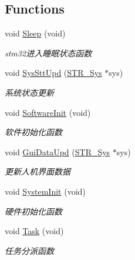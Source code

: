 \subsection*{\-Functions}
\begin{DoxyCompactItemize}
\item 
void \hyperlink{group___m_a_n_a_g_e_ga6ae21a567d8b7f88c319620bd458f1e2}{\-Sleep} (void)
\begin{DoxyCompactList}\small\item\em stm32进入睡眠状态函数 \end{DoxyCompactList}\item 
void \hyperlink{group___m_a_n_a_g_e_ga8dcf623cce7777facf0cc0223fab8e19}{\-Sys\-Stt\-Upd} (\hyperlink{struct_s_t_r___sys}{\-S\-T\-R\-\_\-\-Sys} $\ast$sys)
\begin{DoxyCompactList}\small\item\em 系统状态更新 \end{DoxyCompactList}\item 
\hypertarget{group___m_a_n_a_g_e_ga601c095b03e6638b39ed349f4c24b69e}{void \hyperlink{group___m_a_n_a_g_e_ga601c095b03e6638b39ed349f4c24b69e}{\-Software\-Init} (void)}\label{group___m_a_n_a_g_e_ga601c095b03e6638b39ed349f4c24b69e}

\begin{DoxyCompactList}\small\item\em 软件初始化函数 \end{DoxyCompactList}\item 
\hypertarget{group___m_a_n_a_g_e_gae5433f92dfcd0d1adfc3c045eab15253}{void \hyperlink{group___m_a_n_a_g_e_gae5433f92dfcd0d1adfc3c045eab15253}{\-Gui\-Data\-Upd} (\hyperlink{struct_s_t_r___sys}{\-S\-T\-R\-\_\-\-Sys} $\ast$sys)}\label{group___m_a_n_a_g_e_gae5433f92dfcd0d1adfc3c045eab15253}

\begin{DoxyCompactList}\small\item\em 更新人机界面数据 \end{DoxyCompactList}\item 
void \hyperlink{group___m_a_n_a_g_e_ga93f514700ccf00d08dbdcff7f1224eb2}{\-System\-Init} (void)
\begin{DoxyCompactList}\small\item\em 硬件初始化函数 \end{DoxyCompactList}\item 
void \hyperlink{group___m_a_n_a_g_e_gad7f568b58dcae6573d84519c01f70516}{\-Task} (void)
\begin{DoxyCompactList}\small\item\em 任务分派函数 \end{DoxyCompactList}\end{DoxyCompactItemize}
